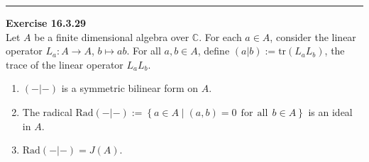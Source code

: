 \documentclass[a4paper, 12pt]{article}
\newenvironment{problem}[2][Exercise]
    { \begin{mdframed}[backgroundcolor=gray!20] \textbf{#1 #2} \\}
    {  \end{mdframed}}
\newcommand{\tr}{\text{tr}}
\newcommand{\Rad}{\text{Rad}}
\begin{document}
\noindent\rule{7in}{2.8pt}
\begin{problem}{16.3.29}
Let \(A\) be a finite dimensional algebra over \(\mathbb{C}\). For each \(a\in A\), consider the linear operator \(L_a:A\rightarrow A\), \(b\mapsto ab\). For all 
\(a,b\in A\), define \((a|b):=\tr(L_aL_b)\), the trace of the linear operator \(L_aL_b\).
\begin{enumerate}[(1)]
\item \((-|-)\) is a symmetric bilinear form on \(A\). 
\item The radical \(\Rad(-|-):=\left\{ a\in A\mid (a,b)=0\ \ \text{for}\ \ \text{all}\ \ b\in A \right\}\) is an ideal in \(A\). 
\item \(\Rad(-|-)=J(A)\).
\end{enumerate}
\end{problem}
\end{document}
